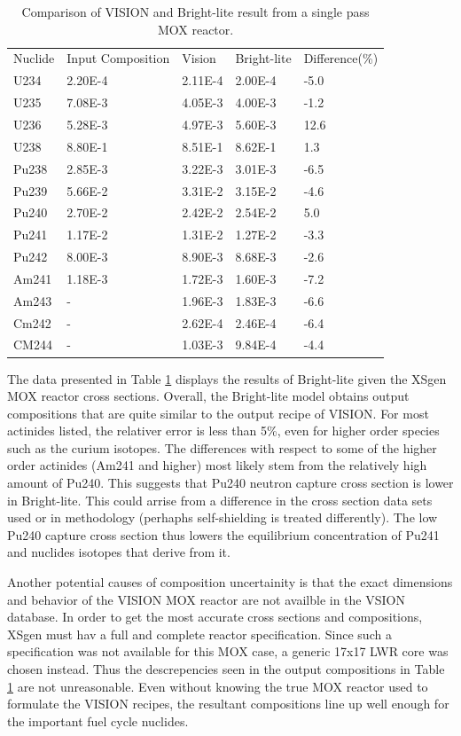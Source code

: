 \documentclass{article}
\begin{document}
\begin{table}[!htb]
\centering
\caption{Comparison of VISION and Bright-lite result from a single pass MOX reactor.}
\label{tab:g}
\begin{tabular}{lllll}
Nuclide & Input Composition & Vision & Bright-lite & Difference(\%) \\
U234 & 2.20E-4 & 2.11E-4 & 2.00E-4 & -5.0\\
U235 & 7.08E-3 & 4.05E-3 & 4.00E-3 & -1.2\\
U236 & 5.28E-3 & 4.97E-3 & 5.60E-3 & 12.6\\
U238 & 8.80E-1 & 8.51E-1 & 8.62E-1 & 1.3\\
Pu238 & 2.85E-3 & 3.22E-3 & 3.01E-3 & -6.5\\
Pu239 & 5.66E-2 & 3.31E-2 & 3.15E-2 & -4.6\\
Pu240 & 2.70E-2 & 2.42E-2 & 2.54E-2 & 5.0\\
Pu241 & 1.17E-2 & 1.31E-2 & 1.27E-2 & -3.3\\
Pu242 & 8.00E-3 & 8.90E-3 & 8.68E-3 & -2.6\\
Am241 & 1.18E-3 & 1.72E-3 & 1.60E-3 & -7.2\\
Am243 & - & 1.96E-3 & 1.83E-3 & -6.6\\
Cm242 & - & 2.62E-4 & 2.46E-4 & -6.4\\
CM244 & - & 1.03E-3 & 9.84E-4 & -4.4
\end{tabular}
\end{table}

The data presented in Table \ref{tab:g} displays the results of Bright-lite given the XSgen MOX
reactor cross sections. Overall, the Bright-lite model obtains output compositions that
are quite similar to the output recipe of VISION. For most actinides listed, the relativer error
is less than 5\%, even for higher order species such as the curium isotopes.
The differences with respect to some of the higher order actinides (Am241 and higher) most
likely stem from the relatively high amount of Pu240. This suggests that Pu240 neutron capture
cross section is lower in Bright-lite. This could arrise from a difference in the cross
section data sets used or in methodology (perhaphs self-shielding is treated differently).
The low Pu240 capture cross section thus lowers the equilibrium concentration of Pu241 and
nuclides isotopes that derive from it.

Another potential causes of composition uncertainity is that the exact dimensions and behavior
of the VISION MOX reactor are not availble in the VSION database. In order to get the
most accurate cross sections and compositions, XSgen must hav a full and complete reactor
specification. Since such a specification was not available for this MOX case,
a generic 17x17 LWR core was chosen instead. Thus the descrepencies seen in the output
compositions in Table \ref{tab:g} are not unreasonable. Even without knowing the
true MOX reactor used to formulate the VISION recipes, the resultant compositions line
up well enough for the important fuel cycle nuclides.
\end{document}
